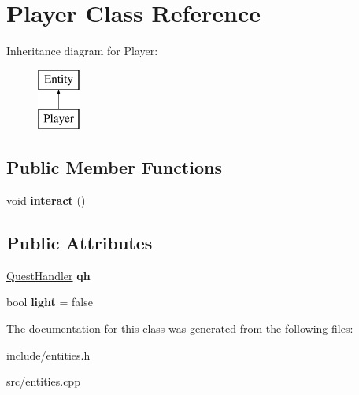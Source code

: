\hypertarget{classPlayer}{}\section{Player Class Reference}
\label{classPlayer}
Inheritance diagram for Player\+:\begin{figure}[H]
\begin{center}
\leavevmode
\includegraphics[height=2.000000cm]{classPlayer}
\end{center}
\end{figure}
\subsection*{Public Member Functions}
\begin{DoxyCompactItemize}
\item 
\hypertarget{classPlayer_a10bc8c26a58ca8c85cc1289b7817ff27}{}void {\bfseries interact} ()\label{classPlayer_a10bc8c26a58ca8c85cc1289b7817ff27}

\end{DoxyCompactItemize}
\subsection*{Public Attributes}
\begin{DoxyCompactItemize}
\item 
\hypertarget{classPlayer_affe7581cbc72ea82130cfdd1f6251df2}{}\hyperlink{classQuestHandler}{Quest\+Handler} {\bfseries qh}\label{classPlayer_affe7581cbc72ea82130cfdd1f6251df2}

\item 
\hypertarget{classPlayer_ae0f3e41a743dcfd1fac43155f166cf5e}{}bool {\bfseries light} = false\label{classPlayer_ae0f3e41a743dcfd1fac43155f166cf5e}

\end{DoxyCompactItemize}


The documentation for this class was generated from the following files\+:\begin{DoxyCompactItemize}
\item 
include/entities.\+h\item 
src/entities.\+cpp\end{DoxyCompactItemize}
